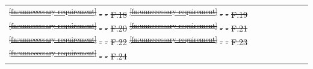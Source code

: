 \documentclass[a4paper,12pt,twoside]{article}
\providecommand{\DIFdeltex}[1]{{\protect\color{red}\sout{#1}}}                      %
\providecommand{\DIFdel}[1]{\texorpdfstring{\DIFdeltex{#1}}{}} %
\begin{document}
\begin{longtable}[]{|m{}| m{} |m{} |m{}|m{}|}
\DIFdel{\textsuperscript{\ref{fn:unnecessary-requirement}} }%
\DIFdel{- }%
\DIFdel{- }%
\DIFdel{F.18 }%
\DIFdel{\textsuperscript{\ref{fn:unnecessary-requirement}} }%
\DIFdel{- }%
\DIFdel{- }%
\DIFdel{F.19 }%
\DIFdel{\textsuperscript{\ref{fn:unnecessary-requirement}} }%
\DIFdel{- }%
\DIFdel{- }%
\DIFdel{F.20 }%
\DIFdel{\textsuperscript{\ref{fn:unnecessary-requirement}} }%
\DIFdel{- }%
\DIFdel{- }%
\DIFdel{F.21 }%
\DIFdel{\textsuperscript{\ref{fn:unnecessary-requirement}}}%
\DIFdel{-}%
\DIFdel{-}%
\DIFdel{F.22 }%
\DIFdel{\textsuperscript{\ref{fn:unnecessary-requirement}}                                                                                              }%
\DIFdel{-        }%
\DIFdel{-            }%
\DIFdel{F.23 }%
\DIFdel{\textsuperscript{\ref{fn:unnecessary-requirement}}                                                                                             }%
\DIFdel{-       }%
\DIFdel{-            }%
\DIFdel{F.24 }%

\end{longtable}
\end{document}
